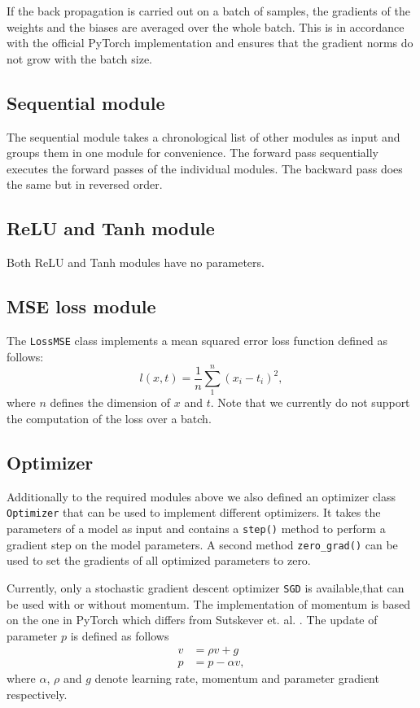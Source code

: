\documentclass[10pt,conference,compsocconf]{IEEEtran}
\begin{document}
If the back propagation is carried out on a batch of samples, the gradients of the weights and the biases are averaged over the whole batch. This is in accordance with the official PyTorch implementation and ensures that the gradient norms do not grow with the batch size.

\subsection{Sequential module}
The sequential module takes a chronological list of other modules as input and groups them in one module for convenience. The forward pass sequentially executes the forward passes of the individual modules. The backward pass does the same but in reversed order.

\subsection{ReLU and Tanh module}
Both ReLU and Tanh modules have no parameters.

\subsection{MSE loss module}
The \texttt{LossMSE} class implements a mean squared error loss function defined as follows:
\begin{equation} \label{eq:MSE}
  l(x,t) = \frac{1}{n} \sum_1^n{(x_i - t_i)^2}, 
\end{equation}
where $n$ defines the dimension of $x$ and $t$. Note that we currently do not support the computation of the loss over a batch.

\subsection{Optimizer}
Additionally to the required modules above we also defined an optimizer class \texttt{Optimizer} that can be used to implement different optimizers. It takes the parameters of a model as input and contains a \texttt{step()} method to perform a gradient step on the model parameters. A second method \texttt{zero\_grad()} can be used to set the gradients of all optimized parameters to zero. 

Currently, only a stochastic gradient descent optimizer \texttt{SGD} is available,that can be used with or without momentum. The implementation of momentum is based on the one in PyTorch which differs from Sutskever et. al. \cite{sutskever2013importance}. The update of parameter $p$ is defined as follows 
\begin{equation} \label{eq:SGDmoment}
  \begin{aligned}
    v &= \rho v + g \\
    p &= p - \alpha v,
  \end{aligned}
\end{equation}
where $\alpha$, $\rho$ and $g$ denote learning rate, momentum and parameter gradient respectively.
\end{document}
